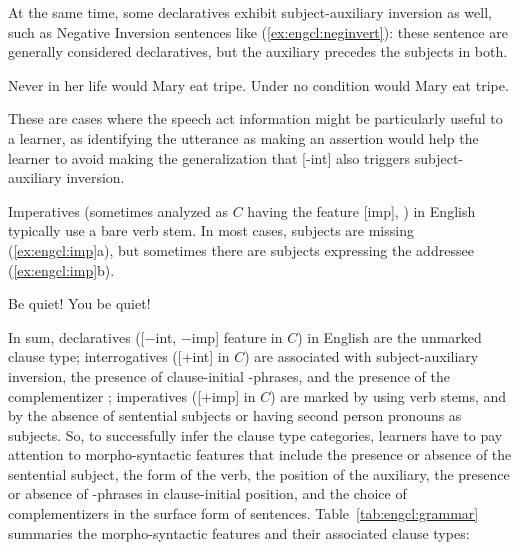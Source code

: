 At the same time, some declaratives exhibit subject-auxiliary inversion as well, such as Negative Inversion sentences like (\ref{ex:engcl:neginvert}): these sentence are generally considered declaratives, but the auxiliary  precedes the subjects in both.

\bxl{}
Never in her life would Mary eat tripe.
\ex
Under no condition would Mary eat tripe.
\exl
\eex

These are cases where the speech act information might be particularly useful to a learner, as identifying the utterance as making an assertion would help the learner to avoid making the generalization that [-int] also triggers subject-auxiliary inversion. 

Imperatives (sometimes analyzed as $C$ having the feature [imp], \cite{platzack1997imp}) in English typically use a bare verb stem. In most cases, subjects are missing (\ref{ex:engcl:imp}a), but sometimes there are subjects expressing the addressee (\ref{ex:engcl:imp}b).

\bxl{}
Be quiet!
\ex You be quiet!
\exl
\eex


In sum, declaratives ([$-$int, $-$imp] feature in $C$) in English are the unmarked clause type; interrogatives ([+int] in $C$) are associated with subject-auxiliary inversion, the presence of clause-initial \twh-phrases, and the presence of the complementizer ; imperatives ([+imp] in $C$) are marked by using verb stems, and by the absence of sentential subjects or having second person pronouns as subjects. So, to successfully infer the clause type categories, learners have to pay attention to morpho-syntactic features that include the presence or absence of the sentential subject, the form of the verb, the position of the auxiliary, the presence or absence of \twh-phrases in clause-initial position, and the choice of complementizers in the surface form of sentences. Table~\ref{tab:engcl:grammar} summaries the morpho-syntactic features and their associated clause types:


